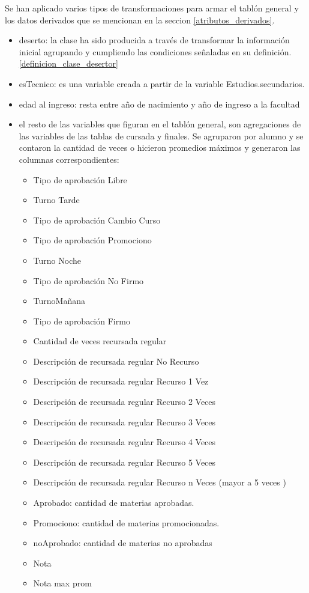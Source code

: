 Se han aplicado varios tipos de transformaciones para armar el tablón general y los datos derivados que se mencionan en la seccion \ref{atributos_derivados}.\\

\begin{itemize}
	\item deserto: la clase ha sido producida a través de transformar la información inicial agrupando y cumpliendo las condiciones señaladas en su definición. \ref{definicion_clase_desertor}
	\item esTecnico: es una variable creada a partir de la variable Estudios.secundarios.
	\item edad al ingreso: resta entre año de nacimiento y año de ingreso a la facultad
	\item el resto de las variables que figuran en el tablón general, son agregaciones de las variables de las tablas de cursada y finales. Se agruparon por alumno y se contaron la cantidad de veces o hicieron promedios máximos y generaron las columnas correspondientes:
	\begin{itemize}
		\item Tipo de aprobación Libre	
		\item Turno Tarde
		\item Tipo de aprobación Cambio Curso
		\item Tipo de aprobación Promociono
		\item Turno Noche
		\item Tipo de aprobación No Firmo
		\item TurnoMañana
		\item Tipo de aprobación Firmo
		\item Cantidad de veces recursada regular
		\item Descripción de recursada regular No Recurso
		\item Descripción de recursada regular Recurso 1 Vez
		\item Descripción de recursada regular Recurso 2 Veces
		\item Descripción de recursada regular Recurso 3 Veces
		\item Descripción de recursada regular Recurso 4 Veces
		\item Descripción de recursada regular Recurso 5 Veces
		\item Descripción de recursada regular Recurso n Veces (mayor a 5 veces )
		\item Aprobado: cantidad de materias aprobadas.
		\item Promociono: cantidad de materias promocionadas.
		\item noAprobado: cantidad de materias no aprobadas
		\item Nota
		\item Nota max prom
	\end{itemize} 
\end{itemize}


